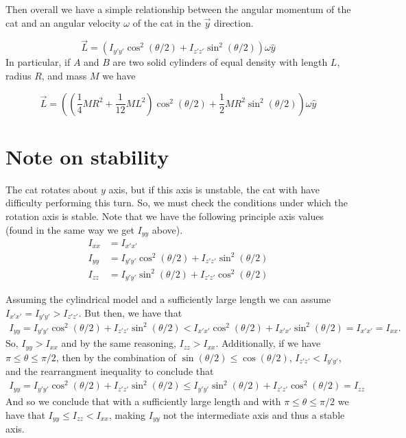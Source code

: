 \documentclass[12]{amsart}
\theoremstyle{definition}
\begin{document}
Then overall we have a simple relationship between the angular momentum of the cat and an angular velocity $\omega$ of the cat in the $\vec{y}$ direction.

\begin{equation}
  \vec{L} = (I_{y'y'} \cos^2(\theta/2) + I_{z'z'} \sin^2(\theta/2))\omega \hat{y}
\end{equation}
In particular, if $A$ and $B$ are two solid cylinders of equal density with length $L$, radius $R$, and mass $M$ we have

\begin{equation}
  \vec{L} = \left(\left( \frac{1}{4} MR^2 + \frac{1}{12} ML^2 \right) \cos^2(\theta/2) + \frac{1}{2} MR^2 \sin^2(\theta/2)\right) \omega \hat{y}
\end{equation}


\section{Note on stability}
The cat rotates about $y$ axis, but if this axis is unstable, the cat with have difficulty performing this turn. So, we must check the conditions under which the rotation axis is stable. Note that we have the following principle axis values (found in the same way we get $I_{yy}$ above).
\begin{align*}
  I_{xx} &= I_{x'x'}\\
  I_{yy} &= I_{y'y'}\cos^2(\theta/2) + I_{z'z'}\sin^2(\theta/2)\\
  I_{zz} &= I_{y'y'}\sin^2(\theta/2) + I_{z'z'}\cos^2(\theta/2)
\end{align*}

Assuming the cylindrical model and a sufficiently large length we can assume $I_{x'x'} = I_{y'y'} > I_{z'z'}$. But then, we have that
\begin{align*}
  I_{yy} = I_{y'y'}\cos^2(\theta/2) + I_{z'z'}\sin^2(\theta/2) < I_{x'x'}\cos^2(\theta/2) + I_{x'x'}\sin^2(\theta/2) = I_{x'x'} = I_{xx}.
\end{align*}
So, $I_{yy} > I_{xx}$ and by the same reasoning, $I_{zz} > I_{xx}$. Additionally, if we have $\pi \leq \theta \leq \pi/2$, then by the combination of $\sin(\theta/2) \leq \cos(\theta/2)$, $I_{z'z'} < I_{y'y'}$, and the rearrangment inequality to conclude that
\begin{align*}
  I_{yy} = I_{y'y'}\cos^2(\theta/2) + I_{z'z'}\sin^2(\theta/2)
  \leq I_{y'y'}\sin^2(\theta/2) + I_{z'z'}\cos^2(\theta/2) = I_{zz}
\end{align*}
And so we conclude that with a sufficiently large length and with $\pi \leq \theta \leq \pi/2$ we have that $I_{yy} \leq I_{zz} < I_{xx}$, making $I_{yy}$ not the intermediate axis and thus a stable axis.
\end{document}
